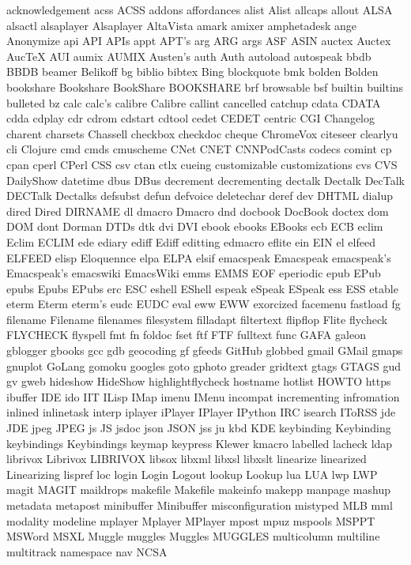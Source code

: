 acknowledgement
acss
ACSS
addons
affordances
alist
Alist
allcaps
allout
ALSA
alsactl
alsaplayer
Alsaplayer
AltaVista
amark
amixer
amphetadesk
ange
Anonymize
api
API
APIs
appt
APT's
arg
ARG
args
ASF
ASIN
auctex
Auctex
AucTeX
AUI
aumix
AUMIX
Austen's
auth
Auth
autoload
autospeak
bbdb
BBDB
beamer
Belikoff
bg
biblio
bibtex
Bing
blockquote
bmk
bolden
Bolden
bookshare
Bookshare
BookShare
BOOKSHARE
brf
browsable
bsf
builtin
builtins
bulleted
bz
calc
calc's
calibre
Calibre
callint
cancelled
catchup
cdata
CDATA
cdda
cdplay
cdr
cdrom
cdstart
cdtool
cedet
CEDET
centric
CGI
Changelog
charent
charsets
Chassell
checkbox
checkdoc
cheque
ChromeVox
citeseer
clearlyu
cli
Clojure
cmd
cmds
cmuscheme
CNet
CNET
CNNPodCasts
codecs
comint
cp
cpan
cperl
CPerl
CSS
csv
ctan
ctlx
cueing
customizable
customizations
cvs
CVS
DailyShow
datetime
dbus
DBus
decrement
decrementing
dectalk
Dectalk
DecTalk
DECTalk
Dectalks
defsubst
defun
defvoice
deletechar
deref
dev
DHTML
dialup
dired
Dired
DIRNAME
dl
dmacro
Dmacro
dnd
docbook
DocBook
doctex
dom
DOM
dont
Dorman
DTDs
dtk
dvi
DVI
ebook
ebooks
EBooks
ecb
ECB
eclim
Eclim
ECLIM
ede
ediary
ediff
Ediff
editting
edmacro
eflite
ein
EIN
el
elfeed
ELFEED
elisp
Eloquennce
elpa
ELPA
elsif
emacspeak
Emacspeak
emacspeak's
Emacspeak's
emacswiki
EmacsWiki
emms
EMMS
EOF
eperiodic
epub
EPub
epubs
Epubs
EPubs
erc
ESC
eshell
EShell
espeak
eSpeak
ESpeak
ess
ESS
etable
eterm
Eterm
eterm's
eudc
EUDC
eval
eww
EWW
exorcized
facemenu
fastload
fg
filename
Filename
filenames
filesystem
filladapt
filtertext
flipflop
Flite
flycheck
FLYCHECK
flyspell
fmt
fn
foldoc
fset
ftf
FTF
fulltext
func
GAFA
galeon
gblogger
gbooks
gcc
gdb
geocoding
gf
gfeeds
GitHub
globbed
gmail
GMail
gmaps
gnuplot
GoLang
gomoku
googles
goto
gphoto
greader
gridtext
gtags
GTAGS
gud
gv
gweb
hideshow
HideShow
highlightflycheck
hostname
hotlist
HOWTO
https
ibuffer
IDE
ido
IIT
ILisp
IMap
imenu
IMenu
incompat
incrementing
infromation
inlined
inlinetask
interp
iplayer
iPlayer
IPlayer
IPython
IRC
isearch
IToRSS
jde
JDE
jpeg
JPEG
js
JS
jsdoc
json
JSON
jss
ju
kbd
KDE
keybinding
Keybinding
keybindings
Keybindings
keymap
keypress
Klewer
kmacro
labelled
lacheck
ldap
librivox
Librivox
LIBRIVOX
libsox
libxml
libxsl
libxslt
linearize
linearized
Linearizing
lispref
loc
login
Login
Logout
lookup
Lookup
lua
LUA
lwp
LWP
magit
MAGIT
maildrops
makefile
Makefile
makeinfo
makepp
manpage
mashup
metadata
metapost
minibuffer
Minibuffer
misconfiguration
mistyped
MLB
mml
modality
modeline
mplayer
Mplayer
MPlayer
mpost
mpuz
mspools
MSPPT
MSWord
MSXL
Muggle
muggles
Muggles
MUGGLES
multicolumn
multiline
multitrack
namespace
nav
NCSA
